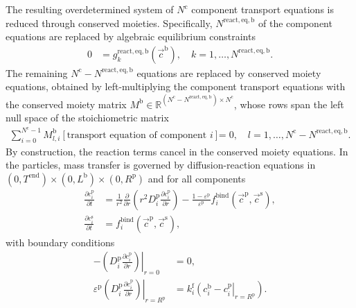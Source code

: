 \documentclass{article}
\begin{document}
The resulting overdetermined system of $N^{\mathrm{c}}$ component transport equations is reduced through conserved moieties.
Specifically, $N^{\mathrm{react,eq},\mathrm{b}}$ of the component equations are replaced by algebraic equilibrium constraints
\begin{align}
    0
    &= g^{\mathrm{react,eq},\mathrm{b}}_{k}\left( \vec{c}^{\mathrm{b}} \right), \quad k = 1, \ldots, N^{\mathrm{react,eq},\mathrm{b}}.
\end{align}
The remaining $N^{\mathrm{c}} - N^{\mathrm{react,eq},\mathrm{b}}$ equations are replaced by conserved moiety equations, obtained by left-multiplying the component transport equations with the conserved moiety matrix $M^{\mathrm{b}} \in \mathbb{R}^{(N^{\mathrm{c}} - N^{\mathrm{react,eq},\mathrm{b}}) \times N^{\mathrm{c}}}$, whose rows span the left null space of the stoichiometric matrix
\begin{align}
    \sum_{i=0}^{N^{\mathrm{c}}-1} M^{\mathrm{b}}_{l,i} \left[ \text{transport equation of component } i \right]
    &= 0, \quad l = 1, \ldots, N^{\mathrm{c}} - N^{\mathrm{react,eq},\mathrm{b}}.
\end{align}
By construction, the reaction terms cancel in the conserved moiety equations.
In the particles, mass transfer is governed by diffusion-reaction equations in $(0, T^{\mathrm{end}}) \times (0, L^{\mathrm{b}})\times (0, R^{\mathrm{p}})$ and for all components
\begin{align}
    \frac{\partial c^{\mathrm{p}}_{i}}{\partial t}
    &= \frac{1}{r^{2}} \frac{\partial }{\partial r} \left( r^{2} D^{\mathrm{p}}_{i} \frac{\partial c^{\mathrm{p}}_{i}}{\partial r} \right)
        - \frac{1 - \varepsilon^{\mathrm{p}}}{\varepsilon^{\mathrm{p}}}f^{\mathrm{bind}}_{i}\left( \vec{c}^{\mathrm{p}}, \vec{c}^{\mathrm{s}} \right),
    \\
    \frac{\partial c^{\mathrm{s}}_{i}}{\partial t}
    &= f^{\mathrm{bind}}_{i}\left( \vec{c}^{\mathrm{p}}, \vec{c}^{\mathrm{s}} \right),
\end{align}
with boundary conditions
\begin{align}
    - \left. \left( D^{\mathrm{p}}_{i} \frac{\partial c^{\mathrm{p}}_{i}}{\partial r} \right) \right|_{r=0}
    &= 0,
    \\
    \varepsilon^{\mathrm{p}} \left. \left( D^{\mathrm{p}}_{i} \frac{\partial c^{\mathrm{p}}_{i}}{\partial r} \right)\right|_{r = R^{\mathrm{p}}}
    &= k^{\mathrm{f}}_{i} \left. \left( c^{\mathrm{b}}_{i} - c^{\mathrm{p}}_{i} \right|_{r = R^{\mathrm{p}}} \right).
\end{align}
\end{document}
